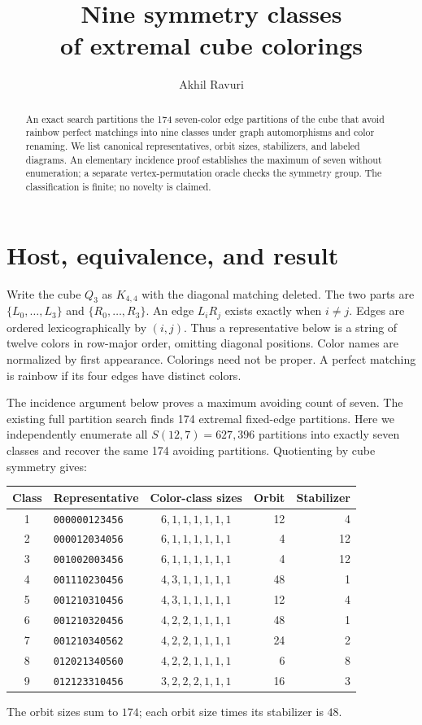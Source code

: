 \documentclass[11pt,letterpaper]{article}
\title{\vspace{-1.5em}\LARGE\bfseries Nine symmetry classes\\of extremal cube colorings}
\author{Akhil Ravuri}\date{}
\begin{document}
\maketitle\vspace{-1.5em}
\begin{abstract}
An exact search partitions the 174 seven-color edge partitions of the cube
that avoid rainbow perfect matchings into nine classes under graph
automorphisms and color renaming. We list canonical representatives, orbit
sizes, stabilizers, and labeled diagrams. An elementary incidence proof
establishes the maximum of seven without enumeration; a separate
vertex-permutation oracle checks the symmetry group. The classification is finite;
no novelty is claimed.
\end{abstract}
\section{Host, equivalence, and result}
Write the cube $Q_3$ as $K_{4,4}$ with the diagonal matching deleted.
The two parts are $\{L_0,\ldots,L_3\}$ and $\{R_0,\ldots,R_3\}$.
An edge $L_iR_j$ exists exactly when $i\ne j$.
Edges are ordered lexicographically by $(i,j)$.
Thus a representative below is a string of twelve colors in row-major order,
omitting diagonal positions. Color names are normalized by first appearance.
Colorings need not be proper. A perfect matching is rainbow if its four
edges have distinct colors.

The incidence argument below proves a maximum avoiding count of seven.
The existing full partition search finds 174 extremal fixed-edge partitions.
Here we independently enumerate
all $S(12,7)=627{,}396$ partitions into exactly seven classes and recover the
same 174 avoiding partitions. Quotienting by cube symmetry gives:
\begin{center}\small
\begin{tabular}{clcrr}\toprule
Class & Representative & Color-class sizes & Orbit & Stabilizer\\\midrule
1 & \texttt{000000123456} & $6,1,1,1,1,1,1$ & 12 & 4 \\
2 & \texttt{000012034056} & $6,1,1,1,1,1,1$ & 4 & 12 \\
3 & \texttt{001002003456} & $6,1,1,1,1,1,1$ & 4 & 12 \\
4 & \texttt{001110230456} & $4,3,1,1,1,1,1$ & 48 & 1 \\
5 & \texttt{001210310456} & $4,3,1,1,1,1,1$ & 12 & 4 \\
6 & \texttt{001210320456} & $4,2,2,1,1,1,1$ & 48 & 1 \\
7 & \texttt{001210340562} & $4,2,2,1,1,1,1$ & 24 & 2 \\
8 & \texttt{012021340560} & $4,2,2,1,1,1,1$ & 6 & 8 \\
9 & \texttt{012123310456} & $3,2,2,2,1,1,1$ & 16 & 3 \\
\bottomrule\end{tabular}\end{center}
The orbit sizes sum to $174$; each orbit size times its stabilizer is $48$.
\end{document}
